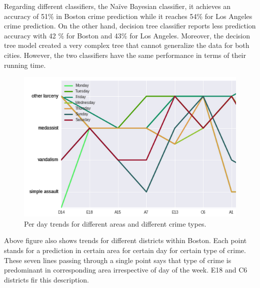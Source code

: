 \documentclass[journal, a4paper]{IEEEtran}
\begin{document}
Regarding different classifiers, the Na{\"i}ve Bayesian classifier, it achieves an
accuracy of 51\% in Boston crime prediction while it reaches 54\% for Los Angeles crime
prediction. On the other hand, decision tree classifier reports less prediction accuracy with 42 \% for Boston and 43\% for Los Angeles. Moreover, the decision tree model created a very complex tree that cannot generalize the data for both cities. However, the two classifiers have the same performance in terms of their running time. 
    \begin{figure}[!hbt]
        \begin{center}
        \includegraphics[width=\columnwidth]{prediction-trends.png}
        \caption{Per day trends for different areas and different crime types.}
        \label{fig:tf_plot}
        \end{center}
    \end{figure}
Above figure also shows trends for different districts within Boston. Each point stands for a prediction in certain area for certain day for certain type of crime. These seven lines passing through a single point says that type of crime is predominant in corresponding area irrespective of day of the week. E18 and C6 districts fir this description.
\end{document}
